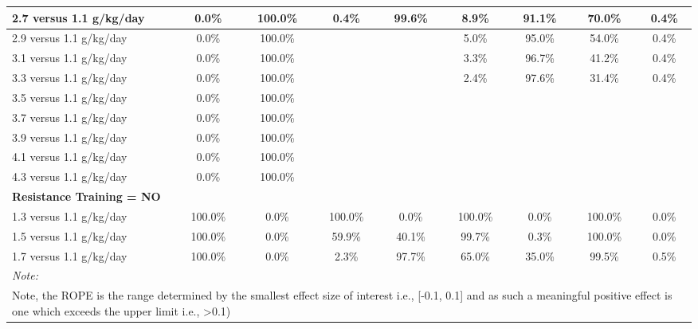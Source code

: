 \documentclass[
]{article}
\begin{document}
\begin{table}
{\begin{tabular}[t]{l|c|c|c|c|c|c|c|c}
\hline
\hspace{1em}2.7 versus 1.1 g/kg/day & 0.0\% & 100.0\% & 0.4\% & 99.6\% & 8.9\% & 91.1\% & 70.0\% & 0.4\%\\
\hline
\hspace{1em}2.9 versus 1.1 g/kg/day & 0.0\% & 100.0\% &  &  & 5.0\% & 95.0\% & 54.0\% & 0.4\%\\
\hline
\hspace{1em}3.1 versus 1.1 g/kg/day & 0.0\% & 100.0\% &  &  & 3.3\% & 96.7\% & 41.2\% & 0.4\%\\
\hline
\hspace{1em}3.3 versus 1.1 g/kg/day & 0.0\% & 100.0\% &  &  & 2.4\% & 97.6\% & 31.4\% & 0.4\%\\
\hline
\hspace{1em}3.5 versus 1.1 g/kg/day & 0.0\% & 100.0\% &  &  &  &  &  & \\
\hline
\hspace{1em}3.7 versus 1.1 g/kg/day & 0.0\% & 100.0\% &  &  &  &  &  & \\
\hline
\hspace{1em}3.9 versus 1.1 g/kg/day & 0.0\% & 100.0\% &  &  &  &  &  & \\
\hline
\hspace{1em}4.1 versus 1.1 g/kg/day & 0.0\% & 100.0\% &  &  &  &  &  & \\
\hline
\hspace{1em}4.3 versus 1.1 g/kg/day & 0.0\% & 100.0\% &  &  &  &  &  & \\
\hline
\multicolumn{9}{l}{\textbf{Resistance Training = NO}}\\
\hline
\hspace{1em}1.3 versus 1.1 g/kg/day & 100.0\% & 0.0\% & 100.0\% & 0.0\% & 100.0\% & 0.0\% & 100.0\% & 0.0\%\\
\hline
\hspace{1em}1.5 versus 1.1 g/kg/day & 100.0\% & 0.0\% & 59.9\% & 40.1\% & 99.7\% & 0.3\% & 100.0\% & 0.0\%\\
\hline
\hspace{1em}1.7 versus 1.1 g/kg/day & 100.0\% & 0.0\% & 2.3\% & 97.7\% & 65.0\% & 35.0\% & 99.5\% & 0.5\%\\
\hline
\multicolumn{9}{l}{\rule{0pt}{1em}\textit{Note: }}\\
\multicolumn{9}{l}{\rule{0pt}{1em}Note, the ROPE is the range determined by the smallest effect size of interest i.e., [-0.1, 0.1] and as such a meaningful positive effect is one which exceeds the upper limit i.e., >0.1)}\\
\end{tabular}

}

\end{table}%
\end{document}

